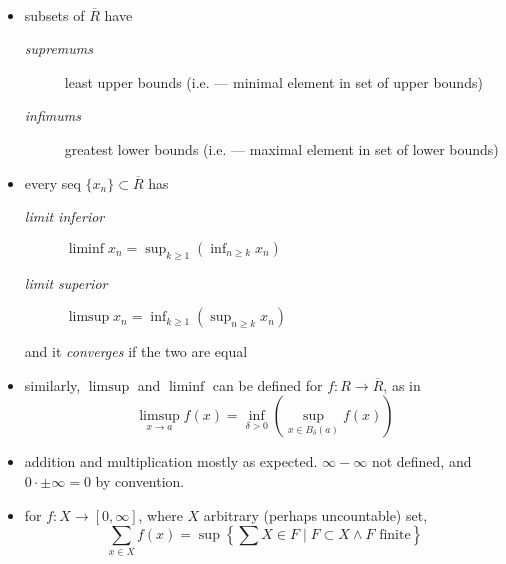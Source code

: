 \begin{defn}\
  \begin{itemize}
  \item subsets of $\overline R$ have
    \begin{description}
    \item[\emph{supremums}] least upper bounds
      (i.e. --- minimal element in set of upper bounds)
    \item[\emph{infimums}] greatest lower bounds
      (i.e. --- maximal element in set of lower bounds)
    \end{description}
  \item every seq ${\{x_n\}\subset\overline R}$ has
    \begin{description}
    \item[\emph{limit inferior}]
      ${\liminf x_n = \sup_{k\geq 1}(\inf_{n\geq k} x_n)}$
    \item[\emph{limit superior}]
      ${\limsup x_n = \inf_{k\geq 1}(\sup_{n\geq k} x_n)}$
    \end{description}
    and it \emph{converges} if the two are equal
  \item similarly, $\limsup$ and $\liminf$ can be defined
    for ${f: R\rightarrow\overline R}$, as in
    \[
    \limsup_{x\rightarrow a} f(x) = \inf_{\delta>0}\left(
    \sup_{x\in B_\delta(a)} f(x) \right)
    \]
  \item addition and multiplication mostly as expected.
    ${\infty-\infty}$ not defined, and
    $0\cdot\pm\infty=0$ by convention.
  \item for ${f: X\rightarrow [0, \infty]}$, where $X$ arbitrary
    (perhaps uncountable) set,
    \[
    \sum_{x\in X} f(x) = \sup\left\{\sum X\in F \mid
    F\subset X \land F \text{ finite}\right\}
    \]
  \end{itemize}
\end{defn}

